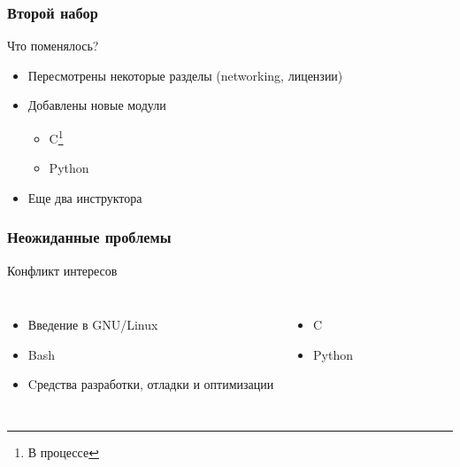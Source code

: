 \begin{frame}
\frametitle{Второй набор}
  \begin{block}{Что поменялось?}
	  \begin{itemize}
		\item Пересмотрены некоторые разделы (networking, лицензии)
		\item Добавлены новые модули
		  \begin{itemize}
	        \item C\footnote{В процессе}
			\item Python
		  \end{itemize}
		\item Еще два инструктора
	  \end{itemize}
  \end{block}
\end{frame}


\begin{frame}
  \frametitle{Неожиданные проблемы}

  \begin{block}{Конфликт интересов}



	\begin{columns}
		\begin{itemize}
			\item Введение в GNU/Linux
			\item Bash
			\item Cредства разработки, отладки и оптимизации
		\end{itemize}

		

		\begin{itemize}
		  \item C
		  \item Python
		\end{itemize}
	\end{columns}

  \end{block}

\end{frame}
